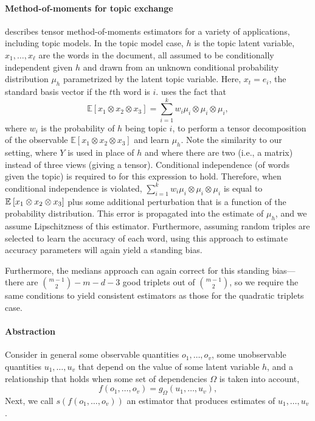 \paragraph{Method-of-moments for topic exchange} \cite{anandkumar2014tensor} describes tensor method-of-moments estimators for a variety of applications, including topic models. In the topic model case, $h$ is the topic latent variable, $x_1, \ldots, x_{\ell}$ are the words in the document, all assumed to be conditionally independent given $h$ and drawn from an unknown conditional probability distribution $\mu_h$ parametrized by the latent topic variable. Here, $x_t = e_i$, the standard basis vector if the $t$th word is $i$. \cite{anandkumar2014tensor} uses the fact that 
\[\mathbb{E}[x_1 \otimes x_2 \otimes x_3] = \sum_{i=1}^k w_i \mu_i \otimes \mu_i \otimes \mu_i,\]
where $w_i$ is the probability of $h$ being topic $i$, to perform a tensor decomposition of the observable  $\mathbb{E}[x_1 \otimes x_2 \otimes x_3]$ and learn $\mu_h$. Note the similarity to our setting, where $Y$ is used in place of $h$ and where there are two (i.e., a matrix) instead of three views (giving a tensor). Conditional independence (of words given the topic) is required to for this expression to hold. Therefore, when conditional independence is violated, $\sum_{i = 1}^k w_i \mu_i \otimes \mu_i \otimes \mu_i$ is equal to $\mathbb{E}_{}\left[x_1 \otimes x_2 \otimes x_3\right]$ plus some additional perturbation that is a function of the probability distribution. This error is propagated into the estimate of $\mu_h$, and we assume Lipschitzness of this estimator. Furthermore, assuming random triples are selected to learn the accuracy of each word, using this approach to estimate accuracy parameters will again yield a standing bias.

Furthermore, the medians approach can again correct for this standing bias---there are ${m - 1 \choose 2} - m - d - 3$ good triplets out of ${m - 1 \choose 2}$, so we require the same conditions to yield consistent estimators as those for the quadratic triplets case.


\paragraph{Abstraction} Consider in general some observable quantities $o_1, \ldots, o_v$, some unobservable quantities $u_1, \ldots, u_v$ that depend on the value of some latent variable $h$, and a relationship that holds when some set of dependencies $\Omega$ is taken into account, 
\[ f(o_1, \ldots, o_v) = g_{\Omega}(u_1, \ldots, u_v),\]
Next, we call $s(f(o_1, \ldots, o_v))$ an estimator that produces estimates of $u_1, \ldots, u_v$. 

